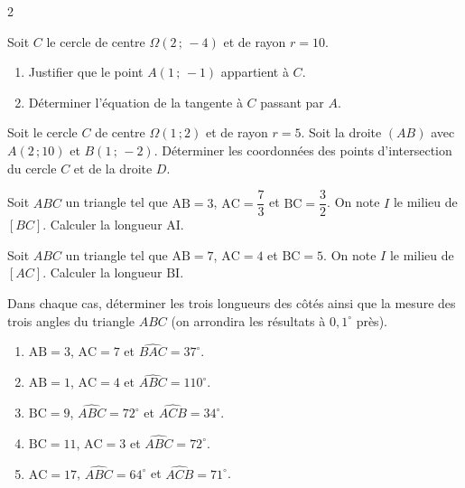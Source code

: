 \documentclass[a4paper,12pt]{article}
\begin{document}
\begin{multicols}{2}
\begin{exercice}[title=Exercice 9 $\star\star$ { [Représenter, Calculer] }]{}{}
  Soit $C$ le cercle de centre $\Omega(2\,;\,-4)$ et de rayon $r = 10$.
  \begin{enumerate}
    \item Justifier que le point $A(1\,;\,-1)$ appartient à $C$.
    \item Déterminer l'équation de la tangente à $C$ passant par $A$.
  \end{enumerate}
\end{exercice}

\begin{exercice}[title=Exercice 10 $\star\star$ { [Représenter, Calculer] }]{}{}
  Soit le cercle $C$ de centre $\Omega(1\,;2)$ et de rayon $r = 5$. Soit la droite $(AB)$ avec $A(2\,;10)$ et $B(1\,;\,-2)$. Déterminer les coordonnées des points d'intersection du cercle $C$ et de la droite $D$.
\end{exercice}

\begin{exercice}[title=Exercice 11 $\star$ { [Représenter, Calculer] }]{}{}
  Soit $ABC$ un triangle tel que $\mathrm{AB} = 3$, $\mathrm{AC} = \dfrac{7}{3}$ et $\mathrm{BC} = \dfrac{3}{2}$. On note $I$ le milieu de $[BC]$. Calculer la longueur $\mathrm{AI}$.
\end{exercice}

\begin{exercice}[title=Exercice 12 $\star$ { [Calculer] }]{}{}
  Soit $ABC$ un triangle tel que $\mathrm{AB} = 7$, $\mathrm{AC} = 4$ et $\mathrm{BC} = 5$. On note $I$ le milieu de $[AC]$. Calculer la longueur $\mathrm{BI}$.
\end{exercice}

\begin{exercice}[title=Exercice 13 $\star$ { [Calculer] }]{}{}
  Dans chaque cas, déterminer les trois longueurs des côtés ainsi que la mesure des trois angles du triangle $ABC$ (on arrondira les résultats à $0{,}1^\circ$ près).

  \begin{enumerate}
    \item $\mathrm{AB} = 3$, $\mathrm{AC} = 7$ et $\widehat{BAC} = 37^\circ$.
    \item $\mathrm{AB} = 1$, $\mathrm{AC} = 4$ et $\widehat{ABC} = 110^\circ$.
    \item $\mathrm{BC} = 9$, $\widehat{ABC} = 72^\circ$ et $\widehat{ACB} = 34^\circ$.
    \item $\mathrm{BC} = 11$, $\mathrm{AC} = 3$ et $\widehat{ABC} = 72^\circ$.
    \item $\mathrm{AC} = 17$, $\widehat{ABC} = 64^\circ$ et $\widehat{ACB} = 71^\circ$.
  \end{enumerate}
\end{exercice}


\end{multicols}
\end{document}
